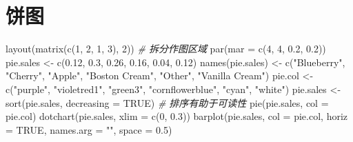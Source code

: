 \documentclass[
  b5paper,
  UTF8,twoside]{book}
\newenvironment{Shaded}{\begin{snugshade}}{\end{snugshade}}
\newcommand{\AttributeTok}[1]{\textcolor[rgb]{0.77,0.63,0.00}{#1}}
\newcommand{\CommentTok}[1]{\textcolor[rgb]{0.56,0.35,0.01}{\textit{#1}}}
\newcommand{\ConstantTok}[1]{\textcolor[rgb]{0.00,0.00,0.00}{#1}}
\newcommand{\DecValTok}[1]{\textcolor[rgb]{0.00,0.00,0.81}{#1}}
\newcommand{\FloatTok}[1]{\textcolor[rgb]{0.00,0.00,0.81}{#1}}
\newcommand{\FunctionTok}[1]{\textcolor[rgb]{0.00,0.00,0.00}{#1}}
\newcommand{\NormalTok}[1]{#1}
\newcommand{\OtherTok}[1]{\textcolor[rgb]{0.56,0.35,0.01}{#1}}
\newcommand{\StringTok}[1]{\textcolor[rgb]{0.31,0.60,0.02}{#1}}
\begin{document}
\hypertarget{sec:pie}{%
\section{饼图}\label{sec:pie}}





\begin{Shaded}
\begin{Highlighting}[]
\FunctionTok{layout}\NormalTok{(}\FunctionTok{matrix}\NormalTok{(}\FunctionTok{c}\NormalTok{(}\DecValTok{1}\NormalTok{, }\DecValTok{2}\NormalTok{, }\DecValTok{1}\NormalTok{, }\DecValTok{3}\NormalTok{), }\DecValTok{2}\NormalTok{)) }\CommentTok{\# 拆分作图区域}
\FunctionTok{par}\NormalTok{(}\AttributeTok{mar =} \FunctionTok{c}\NormalTok{(}\DecValTok{4}\NormalTok{, }\DecValTok{4}\NormalTok{, }\FloatTok{0.2}\NormalTok{, }\FloatTok{0.2}\NormalTok{))}
\NormalTok{pie.sales }\OtherTok{\textless{}{-}} \FunctionTok{c}\NormalTok{(}\FloatTok{0.12}\NormalTok{, }\FloatTok{0.3}\NormalTok{, }\FloatTok{0.26}\NormalTok{, }\FloatTok{0.16}\NormalTok{, }\FloatTok{0.04}\NormalTok{, }\FloatTok{0.12}\NormalTok{)}
\FunctionTok{names}\NormalTok{(pie.sales) }\OtherTok{\textless{}{-}} \FunctionTok{c}\NormalTok{(}\StringTok{"Blueberry"}\NormalTok{, }\StringTok{"Cherry"}\NormalTok{, }\StringTok{"Apple"}\NormalTok{,}
                      \StringTok{"Boston Cream"}\NormalTok{, }\StringTok{"Other"}\NormalTok{, }\StringTok{"Vanilla Cream"}\NormalTok{)}
\NormalTok{pie.col }\OtherTok{\textless{}{-}} \FunctionTok{c}\NormalTok{(}\StringTok{"purple"}\NormalTok{, }\StringTok{"violetred1"}\NormalTok{, }\StringTok{"green3"}\NormalTok{, }\StringTok{"cornflowerblue"}\NormalTok{, }\StringTok{"cyan"}\NormalTok{, }\StringTok{"white"}\NormalTok{)}
\NormalTok{pie.sales }\OtherTok{\textless{}{-}} \FunctionTok{sort}\NormalTok{(pie.sales, }\AttributeTok{decreasing =} \ConstantTok{TRUE}\NormalTok{) }\CommentTok{\# 排序有助于可读性}
\FunctionTok{pie}\NormalTok{(pie.sales, }\AttributeTok{col =}\NormalTok{ pie.col)}
\FunctionTok{dotchart}\NormalTok{(pie.sales, }\AttributeTok{xlim =} \FunctionTok{c}\NormalTok{(}\DecValTok{0}\NormalTok{, }\FloatTok{0.3}\NormalTok{))}
\FunctionTok{barplot}\NormalTok{(pie.sales, }\AttributeTok{col =}\NormalTok{ pie.col, }\AttributeTok{horiz =} \ConstantTok{TRUE}\NormalTok{, }\AttributeTok{names.arg =} \StringTok{""}\NormalTok{, }\AttributeTok{space =} \FloatTok{0.5}\NormalTok{)}
\end{Highlighting}
\end{Shaded}
\end{document}
